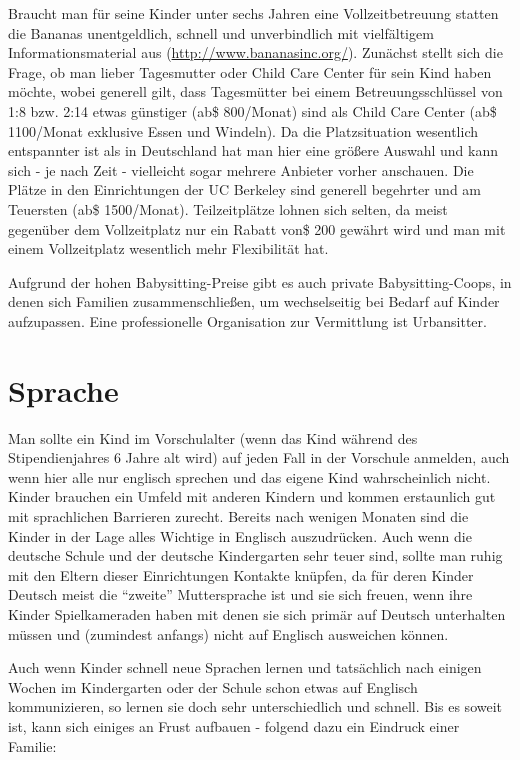 \documentclass[a4paper]{scrreprt}
\begin{document}
Braucht man für seine Kinder unter sechs Jahren eine Vollzeitbetreuung statten die Bananas unentgeldlich, schnell und unverbindlich mit vielfältigem Informationsmaterial aus (\url{http://www.bananasinc.org/}). Zunächst stellt sich die Frage, ob man lieber Tagesmutter oder Child Care Center für sein Kind haben möchte, wobei generell gilt, dass Tagesmütter bei einem Betreuungsschlüssel von 1:8 bzw. 2:14 etwas günstiger (ab\$ 800/Monat) sind als Child Care Center (ab\$ 1100/Monat exklusive Essen und Windeln). Da die Platzsituation wesentlich entspannter ist als in Deutschland hat man hier eine größere Auswahl und kann sich - je nach Zeit - vielleicht sogar mehrere Anbieter vorher anschauen. Die Plätze in den Einrichtungen der UC Berkeley sind generell begehrter und am Teuersten (ab\$ 1500/Monat). Teilzeitplätze lohnen sich selten, da meist gegenüber dem Vollzeitplatz nur ein Rabatt von\$ 200 gewährt wird und man mit einem Vollzeitplatz wesentlich mehr Flexibilität hat. 

Aufgrund der hohen Babysitting-Preise gibt es auch private Babysitting-Coops, in denen sich Familien zusammenschließen, um wechselseitig bei Bedarf auf Kinder aufzupassen.
Eine professionelle Organisation zur Vermittlung ist Urbansitter.

\section{Sprache}

Man sollte ein Kind im Vorschulalter (wenn das Kind während des Stipendienjahres 6 Jahre alt wird) auf jeden Fall in der Vorschule anmelden, auch wenn hier alle nur englisch sprechen und das eigene Kind wahrscheinlich nicht. Kinder brauchen ein Umfeld mit anderen Kindern und kommen erstaunlich gut mit sprachlichen Barrieren zurecht. Bereits nach wenigen Monaten sind die Kinder in der Lage alles Wichtige in Englisch auszudrücken. Auch wenn die deutsche Schule und der deutsche Kindergarten sehr teuer sind, sollte man ruhig mit den Eltern dieser Einrichtungen Kontakte knüpfen, da für deren Kinder Deutsch meist die "`zweite"' Muttersprache ist und sie sich freuen, wenn ihre Kinder Spielkameraden haben mit denen sie sich primär auf Deutsch unterhalten müssen und (zumindest anfangs) nicht auf Englisch ausweichen können.

Auch wenn Kinder schnell neue Sprachen lernen und tatsächlich nach einigen Wochen im Kindergarten oder der Schule schon etwas auf Englisch kommunizieren, so lernen sie doch sehr unterschiedlich und schnell. Bis es soweit ist, kann sich einiges an Frust aufbauen - folgend dazu ein Eindruck einer Familie:
\end{document}
